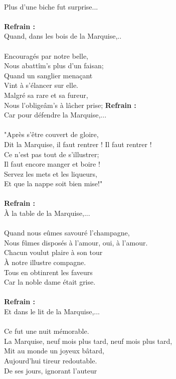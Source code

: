\\Plus d'une biche fut surprise...
\\\\\textbf{Refrain :}
\\Quand, dans les bois de la Marquise,..
\\\\Encouragés par notre belle,
\\Nous abattîm's plus d'un faisan;
\\Quand un sanglier menaçant
\\Vint à s'élancer sur elle.
\\Malgré sa rare et sa fureur,
\\Nous l'obligeâm's à lâcher prise;
\breakpage
\textbf{Refrain :}
\\Car pour défendre la Marquise,...
\\\\"Après s'être couvert de gloire,
\\Dit la Marquise, il faut rentrer ! Il faut rentrer !
\\Ce n'est pas tout de s'illustrer;
\\Il faut encore manger et boire !
\\Servez les mets et les liqueurs,
\\Et que la nappe soit bien mise!"
\\\\\textbf{Refrain :}
\\À la table de la Marquise,...
\\\\Quand nous eûmes savouré l'champagne,
\\Nous fûmes disposés à l'amour, oui, à l'amour.
\\Chacun voulut plaire à son tour
\\À notre illustre compagne.
\\Tous en obtinrent les faveurs
\\Car la noble dame était grise.
\\\\\textbf{Refrain :}
\\Et dans le lit de la Marquise,...
\\\\Ce fut une nuit mémorable.
\\La Marquise, neuf mois plus tard, neuf mois plus tard,
\\Mit au monde un joyeux bâtard,
\\Aujourd'hui tireur redoutable.
\\De ses jours, ignorant l'auteur
